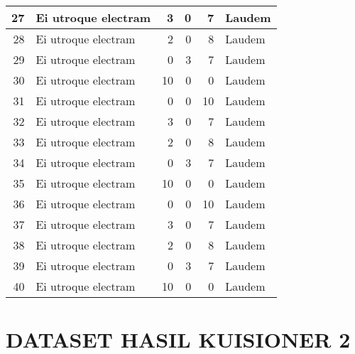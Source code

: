 \begin{small}
\begin{longtable}[c]{|r|l|r|r|r|l|}
27   & Ei utroque electram & 3  & 0  & 7  & Laudem  \\ \hline
28   & Ei utroque electram & 2  & 0  & 8  & Laudem  \\ \hline
29   & Ei utroque electram & 0  & 3  & 7  & Laudem  \\ \hline
30   & Ei utroque electram & 10 & 0  & 0  & Laudem  \\ \hline
31   & Ei utroque electram & 0  & 0  & 10 & Laudem  \\ \hline
32   & Ei utroque electram & 3  & 0  & 7  & Laudem  \\ \hline
33   & Ei utroque electram & 2  & 0  & 8  & Laudem  \\ \hline
34   & Ei utroque electram & 0  & 3  & 7  & Laudem  \\ \hline
35   & Ei utroque electram & 10 & 0  & 0  & Laudem  \\ \hline
36   & Ei utroque electram & 0  & 0  & 10 & Laudem  \\ \hline
37   & Ei utroque electram & 3  & 0  & 7  & Laudem  \\ \hline
38   & Ei utroque electram & 2  & 0  & 8  & Laudem  \\ \hline
39   & Ei utroque electram & 0  & 3  & 7  & Laudem  \\ \hline
40   & Ei utroque electram & 10 & 0  & 0  & Laudem  \\ \hline

\end{longtable}
\end{small}

\chapter{DATASET HASIL KUISIONER 2}

